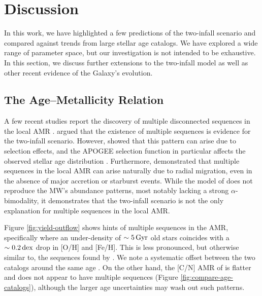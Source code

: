 \documentclass[twocolumn,twocolappendix]{aastex701}
\newcommand{\Gyr}{\,{\rm Gyr}}
\newcommand{\dex}{\,{\rm dex}}
\begin{document}
\section{Discussion}
\label{sec:discussion}

In this work, we have highlighted a few predictions of the two-infall scenario and compared against trends from large stellar age catalogs. We have explored a wide range of parameter space, but our investigation is not intended to be exhaustive. In this section, we discuss further extensions to the two-infall model as well as other recent evidence of the Galaxy's evolution.

\subsection{The Age--Metallicity Relation}
\label{sec:amr}

A few recent studies report the discovery of multiple disconnected sequences in the local AMR \citep[e.g.,][]{sahlholdt_characterizing_2022,xiang_time-resolved_2022,anders_spectroscopic_2023}. \citet{nissen_high-precision_2020} argued that the existence of multiple sequences is evidence for the two-infall scenario. However, \citet{plotnikova_chemical_2024} showed that this pattern can arise due to selection effects, and the APOGEE selection function in particular affects the observed stellar age distribution \citep{imig_galactic_2025}. Furthermore, \citet{chen_recent_2025} demonstrated that multiple sequences in the local AMR can arise naturally due to radial migration, even in the absence of major accretion or starburst events. While the model of \citet{chen_recent_2025} does not reproduce the MW's abundance patterns, most notably lacking a strong $\alpha$-bimodality, it demonstrates that the two-infall scenario is not the only explanation for multiple sequences in the local AMR.

Figure \ref{fig:yield-outflow} shows hints of multiple sequences in the \citet{leung_variational_2023} AMR, specifically where an under-density of $\sim5\Gyr$ old stars coincides with a $\sim0.2\dex$ drop in [O/H] and [Fe/H]. This is less pronounced, but otherwise similar to, the sequences found by \citet{anders_spectroscopic_2023}. We note a systematic offset between the two catalogs around the same age \citep[see Figure 6 of][]{anders_spectroscopic_2023}. On the other hand, the [C/N] AMR of \citet{roberts_cn_2025} is flatter and does not appear to have multiple sequences (Figure \ref{fig:compare-age-catalogs}), although the larger age uncertainties may wash out such patterns.
\end{document}
